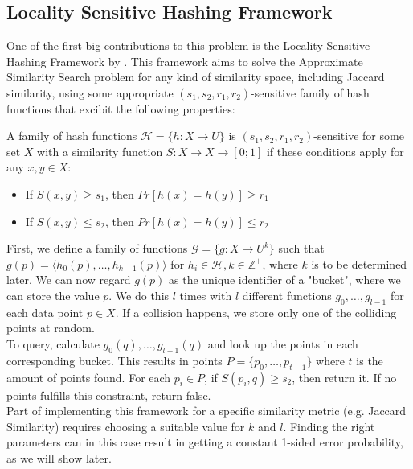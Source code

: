 \subsection{Locality Sensitive Hashing Framework}
One of the first big contributions to this problem is the Locality Sensitive Hashing Framework by \citet{Indyk1998ApproximateNN}. This framework aims to solve the Approximate Similarity Search problem for any kind of similarity space, including Jaccard similarity, using some appropriate $(s_1, s_2, r_1, r_2)$-sensitive family of hash functions that excibit the following properties:
\begin{definition}
\label{thm:sensitive-hash}
A family of hash functions $\mathcal{H}=\{h:X\rightarrow U\}$ is $(s_1, s_2, r_1, r_2)$-sensitive for some set $X$ with a similarity function $S:X\rightarrow X \rightarrow [0;1]$ if these conditions apply for any $x,y \in X$:
\begin{itemize}
    \item If $S(x,y) \geq s_1$, then $Pr[h(x)=h(y)] \geq r_1$
    \item If $S(x,y) \leq s_2$, then $Pr[h(x)=h(y)] \leq r_2$
\end{itemize}
\end{definition}
First, we define a family of functions $\mathcal{G}=\{g : X \rightarrow U^k \}$ such that $g(p)=\langle h_0(p), \dots, h_{k-1}(p)\rangle$ for $h_i\in \mathcal{H}, k\in \mathbb{Z}^+$, where $k$ is to be determined later. We can now regard $g(p)$ as the unique identifier of a "bucket", where we can store the value $p$. We do this $l$ times with $l$ different functions $g_0, \dots, g_{l-1}$ for each data point $p\in X$. If a collision happens, we store only one of the colliding points at random.\\
To query, calculate $g_0(q), \dots, g_{l-1}(q)$ and look up the points in each corresponding bucket. This results in points $P=\{p_0, \dots, p_{t-1}\}$ where $t$ is the amount of points found. For each $p_i \in P$, if $S(p_i, q) \geq s_2$, then return it. If no points fulfills this constraint, return false.\\
Part of implementing this framework for a specific similarity metric (e.g. Jaccard Similarity) requires choosing a suitable value for $k$ and $l$. Finding the right parameters can in this case result in getting a constant 1-sided error probability, as we will show later.
